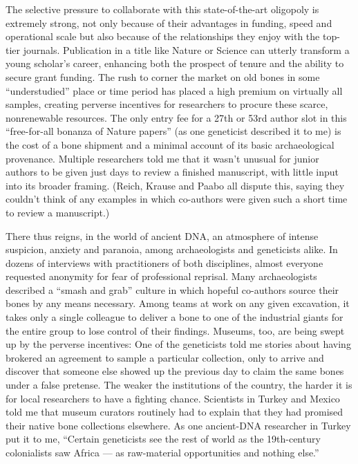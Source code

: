 The selective pressure to collaborate with this state-of-the-art
oligopoly is extremely strong, not only because of their advantages in
funding, speed and operational scale but also because of the
relationships they enjoy with the top-tier journals. Publication in a
title like Nature or Science can utterly transform a young scholar's
career, enhancing both the prospect of tenure and the ability to secure
grant funding. The rush to corner the market on old bones in some
``understudied'' place or time period has placed a high premium on
virtually all samples, creating perverse incentives for researchers to
procure these scarce, nonrenewable resources. The only entry fee for a
27th or 53rd author slot in this ``free-for-all bonanza of Nature
papers'' (as one geneticist described it to me) is the cost of a bone
shipment and a minimal account of its basic archaeological provenance.
Multiple researchers told me that it wasn't unusual for junior authors
to be given just days to review a finished manuscript, with little input
into its broader framing. (Reich, Krause and Paabo all dispute this,
saying they couldn't think of any examples in which co-authors were
given such a short time to review a manuscript.)

There thus reigns, in the world of ancient DNA, an atmosphere of intense
suspicion, anxiety and paranoia, among archaeologists and geneticists
alike. In dozens of interviews with practitioners of both disciplines,
almost everyone requested anonymity for fear of professional reprisal.
Many archaeologists described a ``smash and grab'' culture in which
hopeful co-authors source their bones by any means necessary. Among
teams at work on any given excavation, it takes only a single colleague
to deliver a bone to one of the industrial giants for the entire group
to lose control of their findings. Museums, too, are being swept up by
the perverse incentives: One of the geneticists told me stories about
having brokered an agreement to sample a particular collection, only to
arrive and discover that someone else showed up the previous day to
claim the same bones under a false pretense. The weaker the institutions
of the country, the harder it is for local researchers to have a
fighting chance. Scientists in Turkey and Mexico told me that museum
curators routinely had to explain that they had promised their native
bone collections elsewhere. As one ancient-DNA researcher in Turkey put
it to me, ``Certain geneticists see the rest of world as the
19th-century colonialists saw Africa --- as raw-material opportunities
and nothing else.''

